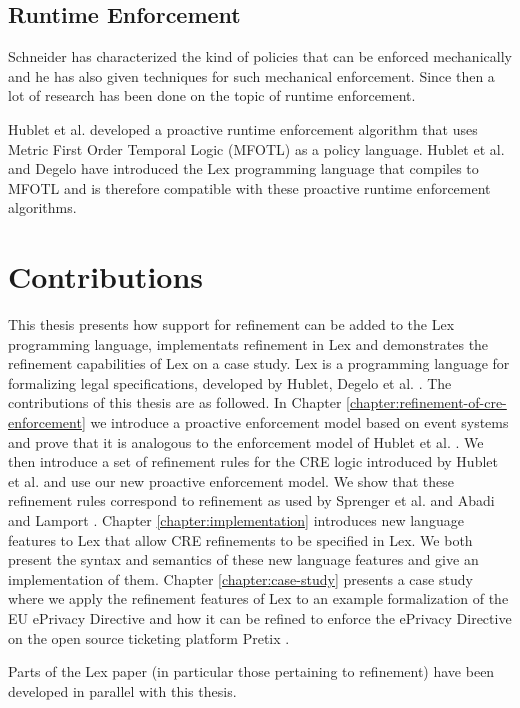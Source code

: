 \subsection{Runtime Enforcement}

Schneider \cite{schneider2000enforceable} has characterized
the kind of policies that can be enforced mechanically and
he has also given techniques for such mechanical enforcement.
Since then a lot of research has been done on the
topic of runtime enforcement.

Hublet et al. \cite{whyenf, whyenf-2} developed a proactive
runtime enforcement algorithm that uses
Metric First Order Temporal Logic (MFOTL)
\cite{basin2015monitoring}
as a policy language.
Hublet et al. \cite{lex} and Degelo \cite{semesterproject}
have introduced the Lex programming language that compiles
to MFOTL and is therefore compatible with these proactive
runtime enforcement algorithms.

\section{Contributions}
\label{section:contributions}

This thesis presents how support for refinement
can be added to the Lex programming language, 
implementats refinement in Lex and demonstrates the
refinement capabilities of Lex on a case study.
Lex is a programming language for formalizing legal specifications,
developed by Hublet, Degelo et al. \cite{lex,semesterproject}.
The contributions of this thesis are as followed.
In Chapter \ref{chapter:refinement-of-cre-enforcement}
we introduce a proactive enforcement model based on
event systems and prove that it is analogous to the enforcement
model of Hublet et al. \cite{whyenf,whyenf-2}.
We then introduce a set of refinement rules for
the CRE logic introduced by Hublet et al. \cite{lex}
and use our new proactive enforcement model.
We show that these refinement rules correspond to refinement
as used by Sprenger et al. \cite{igloo} and Abadi and Lamport
\cite{refinement-mappings}.
Chapter \ref{chapter:implementation} introduces new
language features to Lex that allow CRE refinements to 
be specified in Lex.
We both present the syntax and semantics of these new
language features and give an implementation of them.
Chapter \ref{chapter:case-study} presents a case study
where we apply the refinement features of Lex to
an example formalization of the EU ePrivacy Directive
\cite{EPD2002} and how it can be refined to enforce
the ePrivacy Directive on the open source ticketing platform
Pretix \cite{PretixReinventingTicket}.

Parts of the Lex paper \cite{lex} (in particular those pertaining to refinement)
have been developed in parallel with this thesis.